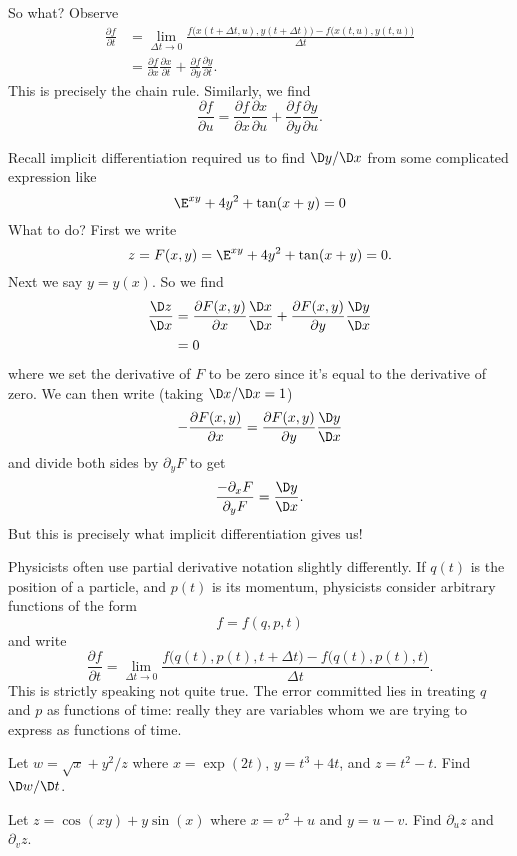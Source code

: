 So what? Observe
\begin{equation}
\begin{aligned}
\frac{\partial f}{\partial t} &= \lim_{\Delta t\to 0}\frac{f\bigl(x(t+\Delta t,u),y(t+\Delta t)\bigr)-f\bigl(x(t,u),y(t,u)\bigr)}{\Delta t} \\
&=\frac{\partial f}{\partial x}\frac{\partial x}{\partial t}+
\frac{\partial f}{\partial y}\frac{\partial y}{\partial t}.
\end{aligned}
\end{equation}
This is precisely the chain rule. Similarly, we find
\begin{equation}
\frac{\partial f}{\partial u}
=\frac{\partial f}{\partial x}\frac{\partial x}{\partial u}+
\frac{\partial f}{\partial y}\frac{\partial y}{\partial u}.
\end{equation}

Recall implicit differentiation required us to find $\D y/\D x$
from some complicated expression like
\begin{equation}
\E^{xy}+4y^{2}+\tan(x+y)=0
\end{equation}
What to do? First we write
\begin{equation}
z = F(x,y) = \E^{xy}+4y^{2}+\tan(x+y)=0.
\end{equation}
Next we say $y=y(x)$. So we find
\begin{equation}
\begin{aligned}
\frac{\D z}{\D x}
&= \frac{\partial F(x,y)}{\partial x}\frac{\D x}{\D x}+\frac{\partial F(x,y)}{\partial y}\frac{\D y}{\D x}\\
&=0
\end{aligned}
\end{equation}
where we set the derivative of $F$ to be zero since it's equal to the
derivative of zero. We can then write (taking $\D x/\D x=1$)
\begin{equation}
-\frac{\partial F(x,y)}{\partial x}=\frac{\partial
  F(x,y)}{\partial y}\frac{\D y}{\D x}
\end{equation}
and divide both sides by $\partial_{y}F$ to get
\begin{equation}
\frac{-\partial_{x}F}{\partial_{y}F} = \frac{\D y}{\D x}.
\end{equation}
But this is precisely what implicit differentiation gives us!

Physicists often use partial derivative notation slightly
differently. If $q(t)$ is the position of a particle, and $p(t)$
is its momentum, physicists consider arbitrary functions of the
form
\begin{equation}
f=f(q,p,t)
\end{equation}
and write
\begin{equation}
\frac{\partial f}{\partial t} = \lim_{\Delta t\to0}
\frac{f\bigl(q(t),p(t),t+\Delta t\bigr)-f\bigl(q(t),p(t),t\bigr)}{\Delta t}.
\end{equation}
This is strictly speaking not quite true. The error committed
lies in treating $q$ and $p$ as functions of time: really they
are variables whom we are trying to express as functions of
time. 

\begin{exercise}
Let $w=\sqrt{x}+y^{2}/z$ where $x=\exp(2t)$, $y=t^{3}+4t$, and
$z=t^{2}-t$. Find $\D w/\D t$.
\end{exercise}
\begin{exercise}
Let $z=\cos(xy)+y\sin(x)$ where $x=v^{2}+u$ and $y=u-v$. Find
$\partial_{u} z$ and $\partial_{v}z$.
\end{exercise}
